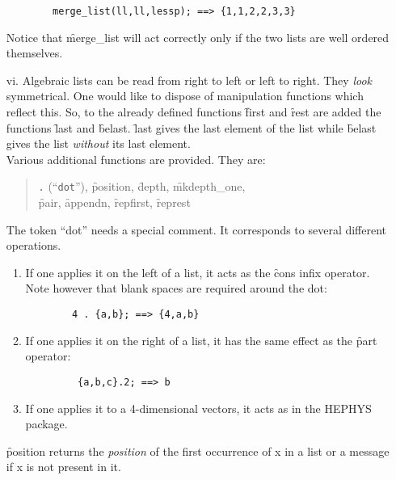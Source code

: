 \begin{itemize}
\begin{verbatim}
        merge_list(ll,ll,lessp); ==> {1,1,2,2,3,3}
\end{verbatim}
Notice that \f{merge\_list} will act correctly only if the two lists 
are well ordered themselves. 
\item[vi.]
Algebraic lists can be read from right to left or left to right.
They \emph{look} symmetrical. One would like to dispose of manipulation
functions which reflect this.
\hypertarget{operator:LAST}{}
\hypertarget{operator:BELAST}{}
So, to the already defined functions  \f{first} and \f{rest} are
added the functions \f{last}  and \f{belast}. \f{last} gives the last
element of the list while \f{belast} gives the list \emph{without} its
last element. \\
Various additional functions are provided. They are:
\hypertarget{operator:POSITION}{}
\hypertarget{operator:DEPTH}{}
\hypertarget{operator:MKDEPTH_ONE}{}
\hypertarget{operator:PAIR}{}
\hypertarget{operator:APPENDN}{}
\hypertarget{operator:REPFIRST}{}
\hypertarget{operator:REPREST}{}
\begin{quote}
\texttt{.} (``\texttt{dot}''), \f{position}, \f{depth}, \f{mkdepth\_one}, \\
\f{pair}, \f{appendn}, \f{repfirst}, \f{represt}
\end{quote}
The token ``dot'' needs a special comment. It corresponds to
several different operations.
\begin{enumerate}
\item If one applies it on the left of a list, it acts as the \f{cons}
infix operator. Note however that blank spaces are required around the dot:
\begin{verbatim}
        4 . {a,b}; ==> {4,a,b}
\end{verbatim}
\item If one applies it on the right of a list, it has the same
effect as the \f{part} operator:
\begin{verbatim}
         {a,b,c}.2; ==> b
\end{verbatim}
\item If one applies it to  a 4-dimensional vectors, it acts as in the
HEPHYS package.
\end{enumerate}
\f{position} returns the \emph{position} of the first occurrence of x in
a list or a message if x is not present in it.


\end{itemize}
